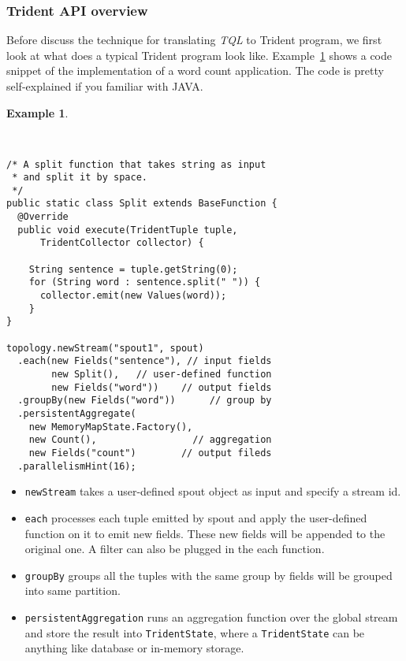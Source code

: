 \documentclass[conference, twocolumn, 11pt]{IEEEtran}
\theoremstyle{definition}
\newtheorem{example}{Example}[section]
\begin{document}
\subsubsection{Trident API overview}
Before discuss the technique for translating \emph{TQL} to Trident program, we first look at what does a typical Trident program look like. Example~\ref{trident-impl-exmp} shows a code snippet of the implementation of a word count application. The code is pretty self-explained if you familiar with JAVA.
\begin{example}\label{trident-impl-exmp}
\footnotesize\begin{verbatim}


/* A split function that takes string as input
 * and split it by space.
 */
public static class Split extends BaseFunction {
  @Override
  public void execute(TridentTuple tuple, 
      TridentCollector collector) {
      
    String sentence = tuple.getString(0);
    for (String word : sentence.split(" ")) {
      collector.emit(new Values(word));
    }
}

topology.newStream("spout1", spout)
  .each(new Fields("sentence"), // input fields
        new Split(),   // user-defined function 
        new Fields("word"))    // output fields
  .groupBy(new Fields("word"))      // group by
  .persistentAggregate(
    new MemoryMapState.Factory(),
    new Count(),                 // aggregation
    new Fields("count")        // output fileds
  .parallelismHint(16);
\end{verbatim}
\normalsize
\end{example}

\begin{itemize}
\item \texttt{newStream} takes a user-defined spout object as input and specify a stream id.
\item \texttt{each} processes each tuple emitted by spout and apply the user-defined function on it to emit new fields. These new fields will be appended to the original one. A filter can also be plugged in the each function.
\item \texttt{groupBy} groups all the tuples with the same group by fields will be grouped into same partition. 
\item \texttt{persistentAggregation} runs an aggregation function over the global stream and store the result into \texttt{TridentState}, where a \texttt{TridentState} can be anything like database or in-memory storage.
\end{itemize}
\end{document}

